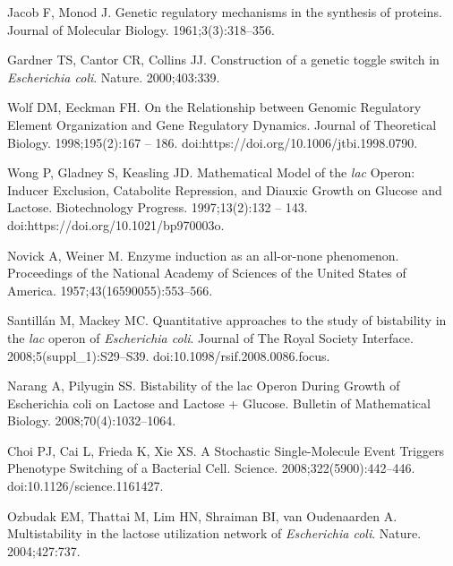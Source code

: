 \documentclass[10pt,letterpaper]{article}
\begin{document}
	\begin{thebibliography}{10}
		
		Jacob F, Monod J.
		\newblock Genetic regulatory mechanisms in the synthesis of proteins.
		\newblock Journal of Molecular Biology. 1961;3(3):318--356.
		
		Gardner TS, Cantor CR, Collins JJ.
		\newblock Construction of a genetic toggle switch in \emph{Escherichia coli}.
		\newblock Nature. 2000;403:339.
		
		Wolf DM, Eeckman FH.
		\newblock On the Relationship between Genomic Regulatory Element Organization
		and Gene Regulatory Dynamics.
		\newblock Journal of Theoretical Biology. 1998;195(2):167 -- 186.
		\newblock doi:{https://doi.org/10.1006/jtbi.1998.0790}.

		Wong P, Gladney S, Keasling JD.
		\newblock Mathematical Model of the \textit{lac} Operon: Inducer Exclusion,
		Catabolite Repression, and Diauxic Growth on Glucose and Lactose.
		\newblock Biotechnology Progress. 1997;13(2):132 -- 143.
		\newblock doi:{https://doi.org/10.1021/bp970003o}.

		Novick A, Weiner M.
		\newblock Enzyme induction as an all-or-none phenomenon.
		\newblock Proceedings of the National Academy of Sciences of the United States
		of America. 1957;43(16590055):553--566.
		
		Santillán M, Mackey MC.
		\newblock Quantitative approaches to the study of bistability in the \emph{lac}
		operon of \emph{Escherichia coli}.
		\newblock Journal of The Royal Society Interface. 2008;5(suppl\_1):S29--S39.
		\newblock doi:{10.1098/rsif.2008.0086.focus}.
		
		Narang A, Pilyugin SS.
		\newblock Bistability of the lac Operon During Growth of Escherichia coli on
		Lactose and Lactose + Glucose.
		\newblock Bulletin of Mathematical Biology. 2008;70(4):1032--1064.
		
		Choi PJ, Cai L, Frieda K, Xie XS.
		\newblock A Stochastic Single-Molecule Event Triggers Phenotype Switching of a
		Bacterial Cell.
		\newblock Science. 2008;322(5900):442--446.
		\newblock doi:{10.1126/science.1161427}.
		
		Ozbudak EM, Thattai M, Lim HN, Shraiman BI, van Oudenaarden A.
		\newblock Multistability in the lactose utilization network of
		\emph{Escherichia coli}.
		\newblock Nature. 2004;427:737.
		

\end{thebibliography}
\end{document}
